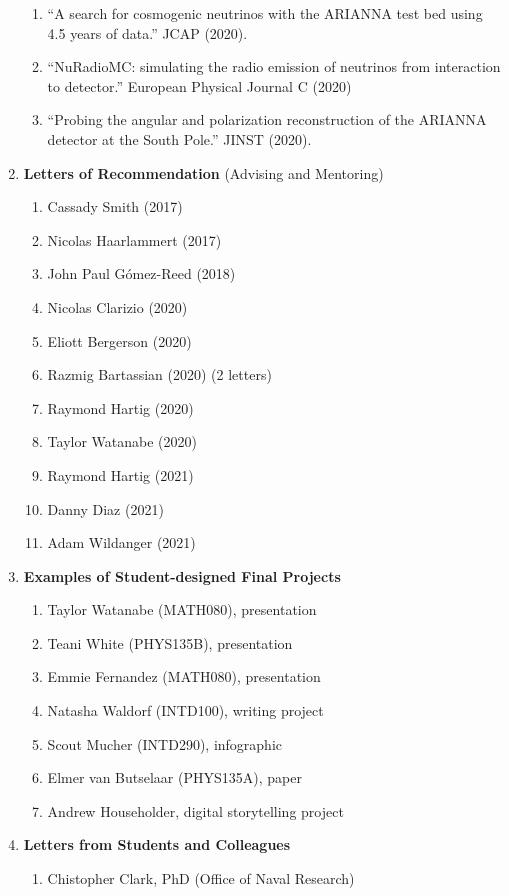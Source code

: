 \documentclass[../../main.tex]{subfiles}
\begin{document}
\begin{enumerate}
\begin{enumerate}
\item ``A search for cosmogenic neutrinos with the ARIANNA test bed using 4.5 years of data.'' JCAP (2020).
\item ``NuRadioMC: simulating the radio emission of neutrinos from interaction to detector.'' European Physical Journal C (2020)
\item ``Probing the angular and polarization reconstruction of the ARIANNA detector at the South Pole.'' JINST (2020).
\end{enumerate}
\item \textbf{Letters of Recommendation} (Advising and Mentoring)
\begin{enumerate}
\item Cassady Smith (2017)
\item Nicolas Haarlammert (2017)
\item John Paul G\'{o}mez-Reed (2018)
\item Nicolas Clarizio (2020)
\item Eliott Bergerson (2020)
\item Razmig Bartassian (2020) (2 letters)
\item Raymond Hartig (2020)
\item Taylor Watanabe (2020)
\item Raymond Hartig (2021)
\item Danny Diaz (2021)
\item Adam Wildanger (2021)
\end{enumerate}
\item \textbf{Examples of Student-designed Final Projects}
\begin{enumerate}
\item Taylor Watanabe (MATH080), presentation
\item Teani White (PHYS135B), presentation
\item Emmie Fernandez (MATH080), presentation
\item Natasha Waldorf (INTD100), writing project
\item Scout Mucher (INTD290), infographic
\item Elmer van Butselaar (PHYS135A), paper
\item Andrew Householder, digital storytelling project
\end{enumerate}
\item \textbf{Letters from Students and Colleagues}
\begin{enumerate}
\item Chistopher Clark, PhD (Office of Naval Research)

\end{enumerate}
\end{enumerate}
\end{document}
